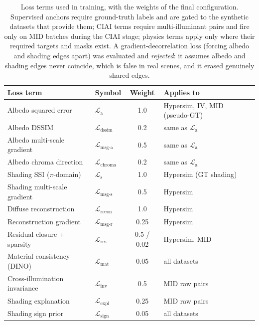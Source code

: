 \begin{table}[t!]
  \caption[Training loss terms and weights.]{%
    Loss terms used in training, with the weights of the final
    configuration.
    Supervised anchors require ground-truth labels and are gated to the
    synthetic datasets that provide them; CIAI terms require multi-illuminant
    pairs and fire only on MID batches during the CIAI stage; physics terms
    apply only where their required targets and masks exist.
    A gradient-decorrelation loss (forcing albedo and shading edges apart) was
    evaluated and \emph{rejected}: it assumes albedo and shading edges never
    coincide, which is false in real scenes, and it erased genuinely shared
    edges.
  }
  \label{tab:losses}
  \centering
  \small
  \begin{tabular}{@{}llcl@{}}
    \toprule
    Loss term & Symbol & Weight & Applies to \\
    \midrule
    Albedo squared error         & $\mathcal{L}_{\text{a}}$        & 1.0  & Hypersim, IV, MID (pseudo-GT) \\
    Albedo DSSIM                 & $\mathcal{L}_{\text{dssim}}$    & 0.2  & same as $\mathcal{L}_{\text{a}}$ \\
    Albedo multi-scale gradient  & $\mathcal{L}_{\text{msg-a}}$    & 0.5  & same as $\mathcal{L}_{\text{a}}$ \\
    Albedo chroma direction      & $\mathcal{L}_{\text{chroma}}$   & 0.2  & same as $\mathcal{L}_{\text{a}}$ \\
    Shading SSI ($\pi$-domain)   & $\mathcal{L}_{\text{s}}$        & 1.0  & Hypersim (GT shading) \\
    Shading multi-scale gradient & $\mathcal{L}_{\text{msg-s}}$    & 0.5  & Hypersim \\
    Diffuse reconstruction       & $\mathcal{L}_{\text{recon}}$    & 1.0  & Hypersim \\
    Reconstruction gradient      & $\mathcal{L}_{\text{msg-r}}$    & 0.25 & Hypersim \\
    Residual closure + sparsity  & $\mathcal{L}_{\text{res}}$      & 0.5 / 0.02 & Hypersim, MID \\
    Material consistency (DINO)  & $\mathcal{L}_{\text{mat}}$      & 0.05 & all datasets \\
    Cross-illumination invariance      & $\mathcal{L}_{\text{inv}}$      & 0.5  & MID raw pairs \\
    Shading explanation          & $\mathcal{L}_{\text{expl}}$     & 0.25 & MID raw pairs \\
    Shading sign prior           & $\mathcal{L}_{\text{sign}}$     & 0.05 & all datasets \\
    \bottomrule
  \end{tabular}
\end{table}


